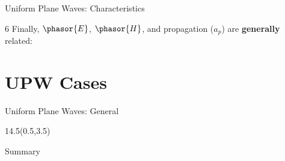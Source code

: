 \begin{lesson36}
\begin{frame}{Uniform Plane Waves: Characteristics}
\begin{textblock}{6}
Finally, $\phasor{E}$, $\phasor{H}$, and propagation ($\hat{a}_p$) are \textbf{generally} related:
\begin{small}
\vspace{-8pt}
\end{small}
\end{textblock}
\end{frame}
%
%


\section{UPW Cases}
\begin{frame}{Uniform Plane Waves: General}
\begin{textblock}{14.5}(0.5,3.5) 
\begin{myblock}[0.9]{Summary}
\vspace{-8pt}

\end{myblock}
\end{textblock}
\end{frame}




\end{lesson36}
